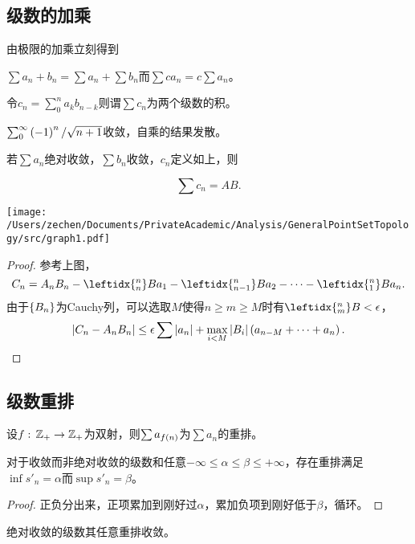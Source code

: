\documentclass{ctexrep}
\begin{document}
  \subsection{级数的加乘}
  由极限的加乘立刻得到
  \begin{theorem}
    $\sum{a_n+b_n}=\sum a_n+\sum b_n$而$\sum ca_n=c\sum a_n$。
  \end{theorem}
  \begin{definition}
    令$c_n=\sum_0^n a_kb_{n-k}$则谓$\sum c_n$为两个级数的积。
  \end{definition}
  \begin{ex}
    $\sum_0^\infty \left(-1\right)^n/\sqrt{n+1}$收敛，自乘的结果发散。
  \end{ex}
  \noindent
  \begin{minipage}{0.7\textwidth}
  \begin{theorem}
    若$\sum a_n$绝对收敛，$\sum b_n$收敛，$c_n$定义如上，则
  \end{theorem}
  \[ \sum c_n = AB. \]
  \end{minipage}
  \begin{minipage}{0.25\textwidth}
  \texttt{[image: /Users/zechen/Documents/PrivateAcademic/Analysis/GeneralPointSetTopology/src/graph1.pdf]} 
  \end{minipage}
  \begin{proof}
    参考上图，
    \[ C_n = A_n B_n - \leftidx{^{n}_{n}}Ba_1 - \leftidx{^{n}_{n-1}}Ba_2 - \cdots - \leftidx{^{n}_{1}}Ba_n. \]
    由于$\left\{B_n\right\}$为Cauchy列，可以选取$M$使得$n\ge m\ge M$时有$\leftidx{^n_m}B<\epsilon$，
    \[ \abs{C_n-A_nB_n} \le \epsilon\sum\abs{a_n} + \max_{i<M}\abs{B_i}\left(a_{n-M} + \cdots + a_n\right). \qedhere \]
  \end{proof}

  \subsection{级数重排}
  \begin{definition}
    设$f:\, \mathbb{Z}_+ \rightarrow \mathbb{Z}_+$为双射，则$\sum a_{f\left(n\right)}$为$\sum a_n$的重排。
  \end{definition}
  \begin{theorem}
    对于收敛而非绝对收敛的级数和任意$-\infty\le\alpha\le\beta\le+\infty$，存在重排满足$\inf s'_n=\alpha$而$\sup s'_n=\beta$。
  \end{theorem}
  \begin{proof}
    正负分出来，正项累加到刚好过$\alpha$，累加负项到刚好低于$\beta$，循环。
  \end{proof}
  \begin{theorem}
    绝对收敛的级数其任意重排收敛。
  \end{theorem}
\end{document}
